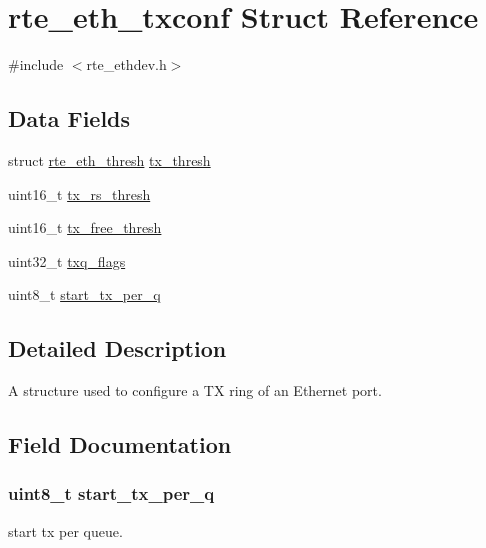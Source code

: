 \hypertarget{structrte__eth__txconf}{}\section{rte\+\_\+eth\+\_\+txconf Struct Reference}
\label{structrte__eth__txconf}


{\ttfamily \#include $<$rte\+\_\+ethdev.\+h$>$}

\subsection*{Data Fields}
\begin{DoxyCompactItemize}
\item 
struct \hyperlink{structrte__eth__thresh}{rte\+\_\+eth\+\_\+thresh} \hyperlink{structrte__eth__txconf_a9644ade07686ec4825d4b7d45f3d6902}{tx\+\_\+thresh}
\item 
uint16\+\_\+t \hyperlink{structrte__eth__txconf_ab7d7dbc33adbb1740718c9a841555dce}{tx\+\_\+rs\+\_\+thresh}
\item 
uint16\+\_\+t \hyperlink{structrte__eth__txconf_ad81b9d171a4d05802d179b0708f0c637}{tx\+\_\+free\+\_\+thresh}
\item 
uint32\+\_\+t \hyperlink{structrte__eth__txconf_a80d79f1953993347e9b0312a2096f86e}{txq\+\_\+flags}
\item 
uint8\+\_\+t \hyperlink{structrte__eth__txconf_ab7352d463bd4628d06a22484326ab7e7}{start\+\_\+tx\+\_\+per\+\_\+q}
\end{DoxyCompactItemize}


\subsection{Detailed Description}
A structure used to configure a T\+X ring of an Ethernet port. 

\subsection{Field Documentation}
\hypertarget{structrte__eth__txconf_ab7352d463bd4628d06a22484326ab7e7}{}
\subsubsection[{start\+\_\+tx\+\_\+per\+\_\+q}]{\setlength{\rightskip}{0pt plus 5cm}uint8\+\_\+t start\+\_\+tx\+\_\+per\+\_\+q}\label{structrte__eth__txconf_ab7352d463bd4628d06a22484326ab7e7}
start tx per queue. \hypertarget{structrte__eth__txconf_ad81b9d171a4d05802d179b0708f0c637}{}

